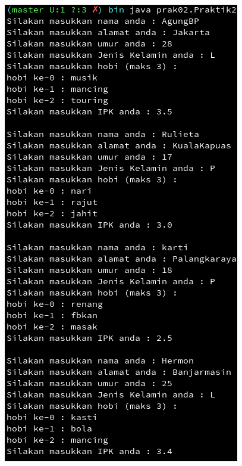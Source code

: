 \documentclass[a4paper,12pt]{article}
\begin{document}
\begin{center}
    \includegraphics[scale=.7]{out-prak2-1.png}

\end{center}
\end{document}
